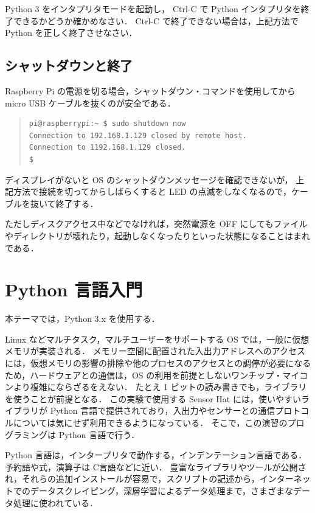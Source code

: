 \documentclass[11pt,a4,epsf]{report}
\begin{document}
\begin{excercise}
Python 3 をインタプリタモードを起動し，
Ctrl-C で Python  インタプリタを終了できるかどうか確かめなさい．
Ctrl-C で終了できない場合は，上記方法で Python を正しく終了させなさい．
\end{excercise}

\subsection{シャットダウンと終了}

Raspberry Pi の電源を切る場合，シャットダウン・コマンドを使用してから micro USB ケーブルを抜くのが安全である．
\begin{quote}
\small
\begin{verbatim}
pi@raspberrypi:~ $ sudo shutdown now
Connection to 192.168.1.129 closed by remote host.
Connection to 1192.168.1.129 closed.
$ 
\end{verbatim}
\end{quote}
ディスプレイがないと OS のシャットダウンメッセージを確認できないが，
上記方法で接続を切ってからしばらくすると LED の点滅をしなくなるので，ケーブルを抜いて終了する．

ただしディスクアクセス中などでなければ，突然電源を OFF にしてもファイルやディレクトリが壊れたり，起動しなくなったりといった状態になることはまれである．



\section{Python 言語入門}

本テーマでは，Python 3.x \cite{python.org-python-3.7.3-doc}を使用する．

Linux などマルチタスク，マルチユーザーをサポートする OS では，一般に仮想メモリが実装される．
メモリー空間に配置された入出力アドレスへのアクセスには，仮想メモリの影響の排除や他のプロセスのアクセスとの調停が必要になるため，ハードウェアとの通信は，OS の利用を前提としないワンチップ・マイコンより複雑にならざるをえない．
たとえ 1 ビットの読み書きでも，ライブラリを使うことが前提となる．
この実験で使用する Sensor Hat には，使いやすいライブラリが Python 言語で提供されており，入出力やセンサーとの通信プロトコルについては気にせず利用できるようになっている．
そこで，この演習のプログラミングは Python 言語で行う．

Python 言語は，インタープリタで動作する，インデンテーション言語である．
予約語や式，演算子は C言語などに近い．
豊富なライブラリやツールが公開され，それらの追加インストールが容易で，スクリプトの記述から，インターネットでのデータスクレイピング，深層学習によるデータ処理まで，さまざまなデータ処理に使われている．
\end{document}
